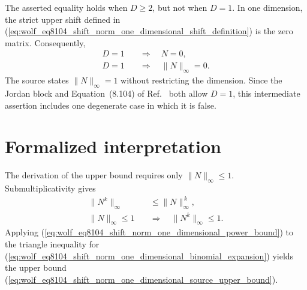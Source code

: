 \documentclass{article}
\begin{document}
The asserted equality holds when $D\geq 2$, but not when $D=1$. In one
dimension, the strict upper shift defined in
(\ref{eq:wolf_eq8104_shift_norm_one_dimensional_shift_definition}) is the zero
matrix. Consequently,
\begin{align}
    D=1
        \quad&\Longrightarrow\quad
        N=0,
    \label{eq:wolf_eq8104_shift_norm_one_dimensional_one_dimensional_shift}\\
    D=1
        \quad&\Longrightarrow\quad
        \|N\|_{\infty}=0.
    \label{eq:wolf_eq8104_shift_norm_one_dimensional_one_dimensional_norm}
\end{align}
The source states $\|N\|_{\infty}=1$ without restricting the dimension. Since
the Jordan block and Equation~(8.104) of Ref.~\cite{Wolf2012Quantum} both
allow $D=1$, this intermediate assertion includes one degenerate case in
which it is false.

\section{Formalized interpretation}

The derivation of the upper bound requires only $\|N\|_{\infty}\leq 1$.
Submultiplicativity gives
\begin{align}
    \|N^k\|_{\infty}
        &\leq \|N\|_{\infty}^{\,k},
    \label{eq:wolf_eq8104_shift_norm_one_dimensional_power_submultiplicativity}\\
    \|N\|_{\infty}\leq 1
        \quad&\Longrightarrow\quad
        \|N^k\|_{\infty}\leq 1.
    \label{eq:wolf_eq8104_shift_norm_one_dimensional_power_bound}
\end{align}
Applying
(\ref{eq:wolf_eq8104_shift_norm_one_dimensional_power_bound}) to the triangle
inequality for
(\ref{eq:wolf_eq8104_shift_norm_one_dimensional_binomial_expansion}) yields
the upper bound
(\ref{eq:wolf_eq8104_shift_norm_one_dimensional_source_upper_bound}).
\end{document}
